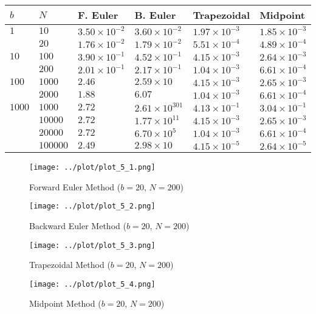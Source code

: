 \begin{solution}
  \begin{tabular}{|llllll|}
    \hline
    $b$    & $N$      & F. Euler    & B. Euler       & Trapezoidal & Midpoint \\
    \hline
    $1$    & $10$     & $3.50 \times 10^{-2}$ & $3.60 \times 10^{-2}$   & $1.97 \times 10^{-3}$ & $1.85 \times 10^{-3}$ \\
           & $20$     & $1.76 \times 10^{-2}$ & $1.79 \times 10^{-2}$   & $5.51 \times 10^{-4}$ & $4.89 \times 10^{-4}$ \\
    $10$   & $100$    & $3.90 \times 10^{-1}$ & $4.52 \times 10^{-1}$   & $4.15 \times 10^{-3}$ & $2.64 \times 10^{-3}$ \\
           & $200$    & $2.01 \times 10^{-1}$ & $2.17 \times 10^{-1}$   & $1.04 \times 10^{-3}$ & $6.61 \times 10^{-4}$ \\
    $100$  & $1000$   & $2.46$                & $2.59 \times 10$        & $4.15 \times 10^{-3}$ & $2.65 \times 10^{-3}$ \\
           & $2000$   & $1.88$                & $6.07$                  & $1.04 \times 10^{-3}$ & $6.61 \times 10^{-4}$ \\
    $1000$ & $1000$   & $2.72$                & $2.61 \times 10^{301}$  & $4.13 \times 10^{-1}$ & $3.04 \times 10^{-1}$ \\
           & $10000$  & $2.72$                & $1.77 \times 10^{11}$   & $4.15 \times 10^{-3}$ & $2.65 \times 10^{-3}$ \\
           & $20000$  & $2.72$                & $6.70 \times 10^{5}$    & $1.04 \times 10^{-3}$ & $6.61 \times 10^{-4}$ \\
           & $100000$ & $2.49$                & $2.98 \times 10$        & $4.15 \times 10^{-5}$ & $2.64 \times 10^{-5}$ \\
    \hline
  \end{tabular}
  
  \begin{figure}[!ht]
    \centering
    \texttt{[image: ../plot/plot\_5\_1.png]}
    \caption{Forward Euler Method ($b=20$, $N=200$)}
    \label{fig:prob5_1}
  \end{figure}
  \begin{figure}[!ht]
    \centering
    \texttt{[image: ../plot/plot\_5\_2.png]}
    \caption{Backward Euler Method ($b=20$, $N=200$)}
    \label{fig:prob5_2}
  \end{figure}
  \begin{figure}[!ht]
    \centering
    \texttt{[image: ../plot/plot\_5\_3.png]}
    \caption{Trapezoidal Method ($b=20$, $N=200$)}
    \label{fig:prob5_3}
  \end{figure}
  \begin{figure}[!ht]
    \centering
    \texttt{[image: ../plot/plot\_5\_4.png]}
    \caption{Midpoint Method ($b=20$, $N=200$)}
    \label{fig:prob5_4}
  \end{figure}
  
\end{solution}